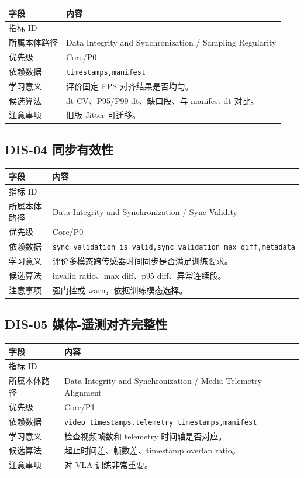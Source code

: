 \documentclass[UTF8,zihao=-4]{ctexart}
\newcommand{\Code}[1]{\texttt{#1}}
\newcommand{\MID}[1]{\texttt{\seqsplit{#1}}}
\begin{document}
\begin{longtable}{L{3.6cm} L{9.6cm}}
\toprule
字段 & 内容 \\
\midrule
指标 ID & \MID{DIS-03} \\
所属本体路径 & Data Integrity and Synchronization / Sampling Regularity \\
优先级 & Core/P0 \\
依赖数据 & \Code{timestamps,manifest} \\
学习意义 & 评价固定 FPS 对齐结果是否均匀。 \\
候选算法 & dt CV、P95/P99 dt、缺口段、与 manifest dt 对比。 \\
注意事项 & 旧版 Jitter 可迁移。 \\
\bottomrule
\end{longtable}

\subsection{DIS-04 同步有效性}

\begin{longtable}{L{3.6cm} L{9.6cm}}
\toprule
字段 & 内容 \\
\midrule
指标 ID & \MID{DIS-04} \\
所属本体路径 & Data Integrity and Synchronization / Sync Validity \\
优先级 & Core/P0 \\
依赖数据 & \Code{sync\_validation\_is\_valid,sync\_validation\_max\_diff,metadata} \\
学习意义 & 评价多模态跨传感器时间同步是否满足训练要求。 \\
候选算法 & invalid ratio、max diff、p95 diff、异常连续段。 \\
注意事项 & 强门控或 warn，依据训练模态选择。 \\
\bottomrule
\end{longtable}

\subsection{DIS-05 媒体-遥测对齐完整性}

\begin{longtable}{L{3.6cm} L{9.6cm}}
\toprule
字段 & 内容 \\
\midrule
指标 ID & \MID{DIS-05} \\
所属本体路径 & Data Integrity and Synchronization / Media-Telemetry Alignment \\
优先级 & Core/P1 \\
依赖数据 & \Code{video timestamps,telemetry timestamps,manifest} \\
学习意义 & 检查视频帧数和 telemetry 时间轴是否对应。 \\
候选算法 & 起止时间差、帧数差、timestamp overlap ratio。 \\
注意事项 & 对 VLA 训练非常重要。 \\
\bottomrule
\end{longtable}
\end{document}
